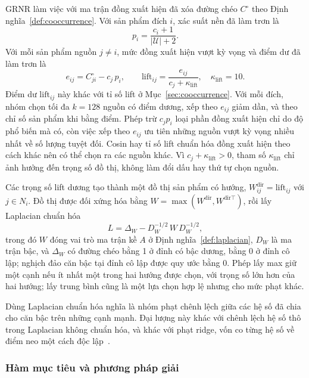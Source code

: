 GRNR làm việc với ma trận đồng xuất hiện đã xóa đường chéo $C^\circ$ theo Định nghĩa~\ref{def:cooccurrence}. Với sản phẩm đích $i$, xác suất nền đã làm trơn là
\begin{equation}
p_i = \frac{c_i+1}{|\mathcal{U}|+2}.
\end{equation}
Với mỗi sản phẩm nguồn $j\ne i$, mức đồng xuất hiện vượt kỳ vọng và điểm dư đã làm trơn là
\begin{equation}
e_{ij} = C^\circ_{ji} - c_j\,p_i, \qquad \mathrm{lift}_{ij} = \frac{e_{ij}}{c_j+\kappa_{\mathrm{lift}}}, \quad \kappa_{\mathrm{lift}} = 10.
\label{eq:grnr-lift}
\end{equation}
Điểm dư $\mathrm{lift}_{ij}$ này khác với tỉ số lift ở Mục~\ref{sec:cooccurrence}. Với mỗi đích, nhóm chọn tối đa $k=128$ nguồn có điểm dương, xếp theo $e_{ij}$ giảm dần, và theo chỉ số sản phẩm khi bằng điểm. Phép trừ $c_jp_i$ loại phần đồng xuất hiện chỉ do độ phổ biến mà có, còn việc xếp theo $e_{ij}$ ưu tiên những nguồn vượt kỳ vọng nhiều nhất về số lượng tuyệt đối. Cosin hay tỉ số lift chuẩn hóa đồng xuất hiện theo cách khác nên có thể chọn ra các nguồn khác. Vì $c_j+\kappa_{\mathrm{lift}}>0$, tham số $\kappa_{\mathrm{lift}}$ chỉ ảnh hưởng đến trọng số đồ thị, không làm đổi dấu hay thứ tự chọn nguồn.

Các trọng số lift dương tạo thành một đồ thị sản phẩm có hướng, $W^{\mathrm{dir}}_{ij}=\mathrm{lift}_{ij}$ với $j\in N_i$. Đồ thị được đối xứng hóa bằng $W=\max(W^{\mathrm{dir}}, W^{\mathrm{dir}\top})$, rồi lấy Laplacian chuẩn hóa
\begin{equation}
L = \Delta_W - D_W^{-1/2}\, W\, D_W^{-1/2},
\end{equation}
trong đó $W$ đóng vai trò ma trận kề $A$ ở Định nghĩa~\ref{def:laplacian}, $D_W$ là ma trận bậc, và $\Delta_W$ có đường chéo bằng 1 ở đỉnh có bậc dương, bằng 0 ở đỉnh cô lập; nghịch đảo căn bậc tại đỉnh cô lập được quy ước bằng 0. Phép lấy max giữ một cạnh nếu ít nhất một trong hai hướng được chọn, với trọng số lớn hơn của hai hướng; lấy trung bình cũng là một lựa chọn hợp lệ nhưng cho mức phạt khác.

Dùng Laplacian chuẩn hóa nghĩa là nhóm phạt chênh lệch giữa các hệ số đã chia cho căn bậc trên những cạnh mạnh. Đại lượng này khác với chênh lệch hệ số thô trong Laplacian không chuẩn hóa, và khác với phạt ridge, vốn co từng hệ số về điểm neo một cách độc lập~\cite[Mục~1.2, 1.4]{chung1997spectral}.

\subsubsection{Hàm mục tiêu và phương pháp giải}
\label{sec:grnr-objective}

